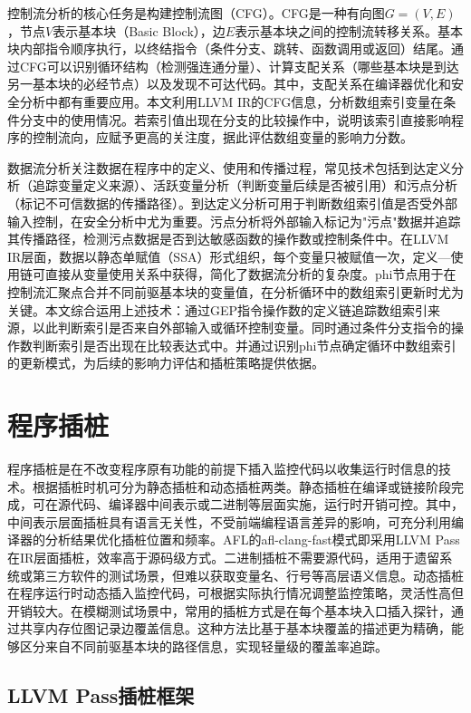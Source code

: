 \documentclass[bachelor]{njupthesis}
\begin{document}
控制流分析的核心任务是构建控制流图（CFG）。CFG是一种有向图$G=(V,E)$，节点$V$表示基本块（Basic Block），边$E$表示基本块之间的控制流转移关系。基本块内部指令顺序执行，以终结指令（条件分支、跳转、函数调用或返回）结尾。通过CFG可以识别循环结构（检测强连通分量）、计算支配关系（哪些基本块是到达另一基本块的必经节点）以及发现不可达代码。其中，支配关系在编译器优化和安全分析中都有重要应用。本文利用LLVM IR的CFG信息，分析数组索引变量在条件分支中的使用情况。若索引值出现在分支的比较操作中，说明该索引直接影响程序的控制流向，应赋予更高的关注度，据此评估数组变量的影响力分数。

数据流分析关注数据在程序中的定义、使用和传播过程，常见技术包括到达定义分析（追踪变量定义来源）、活跃变量分析（判断变量后续是否被引用）和污点分析（标记不可信数据的传播路径）\cite{array_oob_detection}。到达定义分析可用于判断数组索引值是否受外部输入控制，在安全分析中尤为重要。污点分析将外部输入标记为"污点"数据并追踪其传播路径，检测污点数据是否到达敏感函数的操作数或控制条件中。在LLVM IR层面，数据以静态单赋值（SSA）形式组织，每个变量只被赋值一次，定义—使用链可直接从变量使用关系中获得，简化了数据流分析的复杂度。phi节点用于在控制流汇聚点合并不同前驱基本块的变量值，在分析循环中的数组索引更新时尤为关键。本文综合运用上述技术：通过GEP指令操作数的定义链追踪数组索引来源，以此判断索引是否来自外部输入或循环控制变量。同时通过条件分支指令的操作数判断索引是否出现在比较表达式中。并通过识别phi节点确定循环中数组索引的更新模式，为后续的影响力评估和插桩策略提供依据。

\section{程序插桩}

程序插桩是在不改变程序原有功能的前提下插入监控代码以收集运行时信息的技术。根据插桩时机可分为静态插桩和动态插桩两类。静态插桩在编译或链接阶段完成，可在源代码、编译器中间表示或二进制等层面实施，运行时开销可控。其中，中间表示层面插桩具有语言无关性，不受前端编程语言差异的影响，可充分利用编译器的分析结果优化插桩位置和频率。AFL的afl-clang-fast模式即采用LLVM Pass在IR层面插桩，效率高于源码级方式。二进制插桩不需要源代码，适用于遗留系统或第三方软件的测试场景，但难以获取变量名、行号等高层语义信息。动态插桩在程序运行时动态插入监控代码，可根据实际执行情况调整监控策略，灵活性高但开销较大。在模糊测试场景中，常用的插桩方式是在每个基本块入口插入探针，通过共享内存位图记录边覆盖信息。这种方法比基于基本块覆盖的描述更为精确，能够区分来自不同前驱基本块的路径信息，实现轻量级的覆盖率追踪\cite{LLVM}。

\subsection{LLVM Pass插桩框架}
\end{document}
